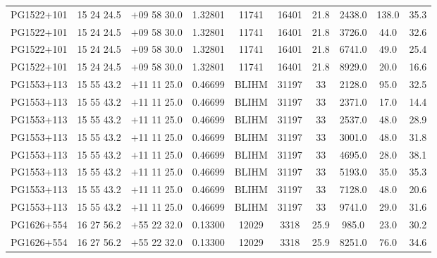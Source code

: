 \begin{landscape}
\begin{center}
\begin{longtable}{l c c c c c c c c c}
PG1522+101  &              15 24 24.5  &         $+$09 58 30.0  &       1.32801  & 11741  &   16401  &      21.8  &      2438.0  &  138.0  &  35.3  \\
PG1522+101  &              15 24 24.5  &         $+$09 58 30.0  &       1.32801  & 11741  &   16401  &      21.8  &      3726.0  &  44.0  &   32.6  \\
PG1522+101  &              15 24 24.5  &         $+$09 58 30.0  &       1.32801  & 11741  &   16401  &      21.8  &      6741.0  &  49.0  &   25.4  \\
PG1522+101  &              15 24 24.5  &         $+$09 58 30.0  &       1.32801  & 11741  &   16401  &      21.8  &      8929.0  &  20.0  &   16.6  \\
PG1553+113  &              15 55 43.2  &         $+$11 11 25.0  &       0.46699  & BLIHM  &   31197  &      33  &        2128.0  &  95.0  &   32.5  \\
PG1553+113  &              15 55 43.2  &         $+$11 11 25.0  &       0.46699  & BLIHM  &   31197  &      33  &        2371.0  &  17.0  &   14.4  \\
PG1553+113  &              15 55 43.2  &         $+$11 11 25.0  &       0.46699  & BLIHM  &   31197  &      33  &        2537.0  &  48.0  &   28.9  \\
PG1553+113  &              15 55 43.2  &         $+$11 11 25.0  &       0.46699  & BLIHM  &   31197  &      33  &        3001.0  &  48.0  &   31.8  \\
PG1553+113  &              15 55 43.2  &         $+$11 11 25.0  &       0.46699  & BLIHM  &   31197  &      33  &        4695.0  &  28.0  &   38.1  \\
PG1553+113  &              15 55 43.2  &         $+$11 11 25.0  &       0.46699  & BLIHM  &   31197  &      33  &        5193.0  &  35.0  &   35.3  \\
PG1553+113  &              15 55 43.2  &         $+$11 11 25.0  &       0.46699  & BLIHM  &   31197  &      33  &        7128.0  &  48.0  &   20.6  \\
PG1553+113  &              15 55 43.2  &         $+$11 11 25.0  &       0.46699  & BLIHM  &   31197  &      33  &        9741.0  &  29.0  &   31.6  \\
PG1626+554  &              16 27 56.2  &         $+$55 22 32.0  &       0.13300  & 12029  &   3318  &       25.9  &      985.0  &   23.0  &   30.2  \\
PG1626+554  &              16 27 56.2  &         $+$55 22 32.0  &       0.13300  & 12029  &   3318  &       25.9  &      8251.0  &  76.0  &   34.6  \\

\end{longtable}
\end{center}
\end{landscape}
